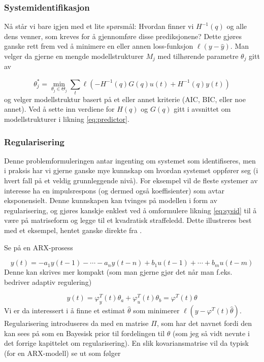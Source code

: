 \subsubsection{Systemidentifikasjon}
Nå står vi bare igjen med et lite spørsmål: Hvordan finner vi $H^{-1}(q)$ og alle dens venner, som kreves for å gjennomføre disse prediksjonene? Dette gjøres ganske rett frem ved å minimere en eller annen loss-funksjon $\ell ( y - \hat{y} )$. Man velger da gjerne en mengde modellstrukturer $M_j$ med tilhørende parametre $\theta_j$ gitt av

\begin{equation}
	\theta_{j}^{*}=\underset{\theta_{j} \in \Theta_{j}}{\min } \sum_{t} \ell\left(-H^{-1}(q) G(q) u(t)+H^{-1}(q) y(t)\right)
	\label{eq:sysid}
\end{equation}
og velger modellstruktur basert på et eller annet kriterie (AIC, BIC, eller noe annet). Ved å sette inn verdiene for $H(q)$ og $G(q)$ gitt i avsnittet om modellstrukturer i likning \ref{eq:predictor}.

\subsubsection{Regularisering}
Denne problemformuleringen antar ingenting om systemet som identifiseres, men i praksis har vi gjerne ganske mye kunnskap om hvordan systemet oppfører seg (i hvert fall på et veldig grunnleggende nivå). For eksempel vil de fleste systemer av interesse ha en impulsrespons (og dermed også koeffisienter) som avtar eksponensielt. Denne kunnskapen kan tvinges på modellen i form av regularisering, og gjøres kanskje enklest ved å omformulere likning \ref{eq:sysid} til å være på matriseform og legge til et kvadratisk straffeledd. Dette illustreres best med et eksempel, hentet ganske direkte fra \cite{Chen2013}.

Se på en ARX-prosess

\begin{equation}
	y(t) = -a_1 y(t-1) - \cdots - a_n y(t-n) + b_1 u(t-1) + \cdots + b_m u(t-m)
	\label{eq:ARX}
\end{equation}
Denne kan skrives mer kompakt (som man gjerne gjør det når man f.eks. bedriver adaptiv regulering)

\begin{equation}
	y(t) = \varphi_y ^T (t) \theta_a + \varphi_u ^T (t) \theta_b = \varphi ^T (t) \theta
	\label{eq:ARX2}
\end{equation}
Vi er da interessert i å finne et estimat $\hat{\theta}$ som minimerer $\ell( y - \varphi ^T (t) \hat{\theta} )$. Regularisering introduseres da med en matrise $\Pi$, som har det navnet fordi den kan sees på som en Bayesisk prior til fordelingen til $\theta$ (som jeg så vidt nevnte i det forrige kapittelet om regularisering). En slik kovariansmatrise vil da typisk (for en ARX-modell) se ut som følger

